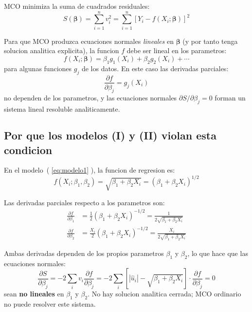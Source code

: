 \documentclass[12pt, letterpaper]{article}
\theoremstyle{remark}
\begin{document}
MCO minimiza la suma de cuadrados residuales:
\begin{equation}
  S(\boldsymbol\beta) = \sum_{i=1}^n v_i^2 = \sum_{i=1}^n [Y_i - f(X_i; \boldsymbol\beta)]^2
  \label{eq:SCR}
\end{equation}

Para que MCO produzca ecuaciones normales \emph{lineales} en $\boldsymbol\beta$
(y por tanto tenga solucion analitica explicita), la funcion $f$ debe ser
lineal en los parametros:
\begin{equation}
  f(X_i; \boldsymbol\beta) = \beta_1 g_1(X_i) + \beta_2 g_2(X_i) + \cdots
  \label{eq:lineal_param}
\end{equation}
para algunas funciones $g_j$ de los datos. En este caso las derivadas parciales:
\begin{equation}
  \frac{\partial f}{\partial \beta_j} = g_j(X_i)
  \label{eq:deriv_lineal}
\end{equation}
no dependen de los parametros, y las ecuaciones normales
$\partial S/\partial \beta_j = 0$ forman un sistema lineal resoluble
analitica­mente.

\subsection{Por que los modelos (I) y (II) violan esta condicion}

En el modelo~( \ref{eq:modelo1} ), la funcion de regresion es:
\begin{equation}
  f(X_i; \beta_1, \beta_2) = \sqrt{\beta_1 + \beta_2 X_i}
  = (\beta_1 + \beta_2 X_i)^{1/2}
  \label{eq:f_modelo1}
\end{equation}

Las derivadas parciales respecto a los parametros son:
\begin{align}
  \frac{\partial f}{\partial \beta_1}
    &= \frac{1}{2}(\beta_1 + \beta_2 X_i)^{-1/2}
    = \frac{1}{2\sqrt{\beta_1 + \beta_2 X_i}}
  \label{eq:df_db1}\\[6pt]
  \frac{\partial f}{\partial \beta_2}
    &= \frac{X_i}{2}(\beta_1 + \beta_2 X_i)^{-1/2}
    = \frac{X_i}{2\sqrt{\beta_1 + \beta_2 X_i}}
  \label{eq:df_db2}
\end{align}

Ambas derivadas dependen de los propios parametros $\beta_1$ y $\beta_2$, lo que
hace que las ecuaciones normales:
\begin{equation}
  \frac{\partial S}{\partial \beta_j}
    = -2\sum_i v_i \frac{\partial f}{\partial \beta_j}
    = -2\sum_i [|\hat u_i| - \sqrt{\beta_1 + \beta_2 X_i}]
      \cdot \frac{\partial f}{\partial \beta_j}
    = 0
  \label{eq:ec_normales}
\end{equation}
sean \textbf{no lineales} en $\beta_1$ y $\beta_2$. No hay solucion analitica
cerrada; MCO ordinario no puede resolver este sistema.
\end{document}

